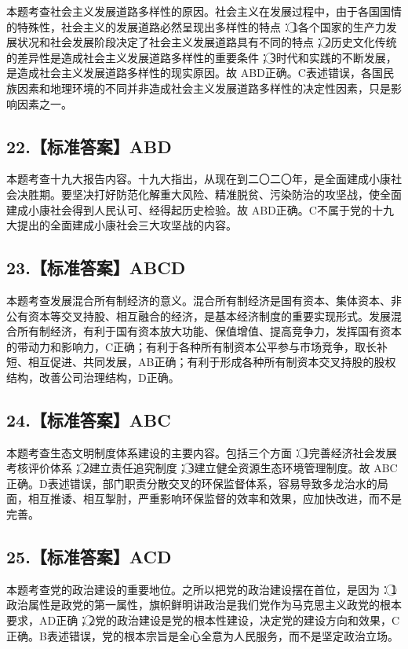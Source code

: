 \documentclass[UTF8,11pt]{ctexart}
\begin{document}
本题考查社会主义发展道路多样性的原因。社会主义在发展过程中，由于各国国情的特殊性，社会主义的发展道路必然呈现出多样性的特点：\textcircled{1}各个国家的生产力发展状况和社会发展阶段决定了社会主义发展道路具有不同的特点；\textcircled{2}历史文化传统的差异性是造成社会主义发展道路多样性的重要条件；\textcircled{3}时代和实践的不断发展，是造成社会主义发展道路多样性的现实原因。故 ABD正确。C表述错误，各国民族因素和地理环境的不同并非造成社会主义发展道路多样性的决定性因素，只是影响因素之一。


\subsection*{22.【标准答案】ABD}

本题考查十九大报告内容。十九大指出，从现在到二〇二〇年，是全面建成小康社会决胜期。要坚决打好防范化解重大风险、精准脱贫、污染防治的攻坚战，使全面建成小康社会得到人民认可、经得起历史检验。故 ABD正确。C不属于党的十九大提出的全面建成小康社会三大攻坚战的内容。


\subsection*{23.【标准答案】ABCD}

本题考查发展混合所有制经济的意义。混合所有制经济是国有资本、集体资本、非公有资本等交叉持股、相互融合的经济，是基本经济制度的重要实现形式。发展混合所有制经济，有利于国有资本放大功能、保值增值、提高竞争力，发挥国有资本的带动力和影响力，C正确；有利于各种所有制资本公平参与市场竞争，取长补短、相互促进、共同发展，AB正确；有利于形成各种所有制资本交叉持股的股权结构，改善公司治理结构，D正确。


\subsection*{24.【标准答案】ABC}

本题考查生态文明制度体系建设的主要内容。包括三个方面：\textcircled{1}完善经济社会发展考核评价体系；\textcircled{2}建立责任追究制度；\textcircled{3}建立健全资源生态环境管理制度。故 ABC 正确。D表述错误，部门职责分散交叉的环保监督体系，容易导致多龙治水的局面，相互推诿、相互掣肘，严重影响环保监督的效率和效果，应加快改进，而不是完善。


\subsection*{25.【标准答案】ACD}

本题考查党的政治建设的重要地位。之所以把党的政治建设摆在首位，是因为：\textcircled{1}政治属性是政党的第一属性，旗帜鲜明讲政治是我们党作为马克思主义政党的根本要求，AD正确；\textcircled{2}党的政治建设是党的根本性建设，决定党的建设方向和效果，C正确。B表述错误，党的根本宗旨是全心全意为人民服务，而不是坚定政治立场。
\end{document}
